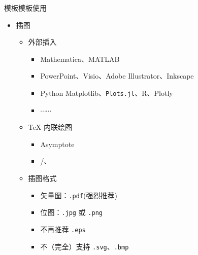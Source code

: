 \documentclass[xcolor=svgnames, t, aspectratio=169]{ctexbeamer}
\begin{document}
\begin{frame}{\nwafuthesis 模板}{模板使用}
  \stretchon
  \begin{itemize}
  \item 插图
    \begin{itemize}
    \item 外部插入

      \begin{itemize}
      \item Mathematica、MATLAB
      \item PowerPoint、Visio、Adobe Illustrator、Inkscape
      \item Python Matplotlib、\texttt{Plots.jl}、R、Plotly
      \item $\cdots\cdots$
      \end{itemize}

    \item \TeX{} 内联绘图

      \begin{itemize}
      \item Asymptote
      \item \alert{/、}
      \end{itemize}

    \item 插图格式

      \begin{itemize}
      \item 矢量图：\texttt{.pdf}(\alert{强烈推荐})
      \item 位图：\texttt{.jpg} 或 \texttt{.png}
      \item \alert{不再推荐 \texttt{.eps}}
      \item 不（完全）支持 \texttt{.svg}、\texttt{.bmp}
      \end{itemize}
    \end{itemize}
  \end{itemize}
  \stretchoff
\end{frame}
\end{document}
